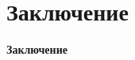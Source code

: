 
\section{Заключение}

\begin{frame}

\vspace{\baselineskip}

\vspace{\baselineskip}

\begin{center}
    \Huge{\textbf{Заключение}}
\end{center}

\end{frame}

